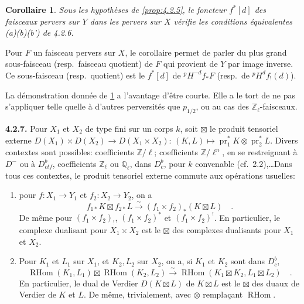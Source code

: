 \documentclass[12pt,a4paper]{article}
\theoremstyle{plain}
\newtheorem{corollary}[theorem]{Corollaire}
\theoremstyle{definition}
\DeclareMathOperator{\RHom}{RHom}
\newcommand{\isom}{\xrightarrow{\sim}}
\providecommand{\pr}{\operatorname{pr}}
\providecommand{\RHom}{\operatorname{RHom}}
\begin{document}
\begin{corollary}\label{cor:4.2.6.2}
Sous les hypoth\`{e}ses de \ref{prop:4.2.5}, le foncteur $f^{*}[d]$ des faisceaux pervers sur $Y$ dans les pervers sur $X$ v\'{e}rifie les conditions \'{e}quivalentes (a)(b)(b') de 4.2.6.
\end{corollary}

Pour $F$ un faisceau pervers sur $X$, le corollaire permet de parler du plus grand sous-faisceau (resp.\ faisceau quotient) de $F$ qui provient de $Y$ par image inverse. Ce sous-faisceau (resp.\ quotient) est le $f^{*}[d]$ de ${}^{p}H^{-d}f_{*}F$ (resp.\ de ${}^{p}H^{d}f_{!}(d)$).

La d\'{e}monstration donn\'{e}e de \ref{cor:4.2.6.2} a l'avantage d'\^{e}tre courte. Elle a le tort de ne pas s'appliquer telle quelle \`{a} d'autres perversit\'{e}s que $p_{1/2}$, ou au cas des $\mathbb{Z}_{\ell}$-faisceaux.

\noindent\textbf{4.2.7.} Pour $X_{1}$ et $X_{2}$ de type fini sur un corps $k$, soit $\boxtimes$ le produit tensoriel externe $D(X_{1}) \times D(X_{2}) \longrightarrow D(X_{1} \times X_{2})$: $(K,L) \longmapsto \pr_{1}^{*}K \otimes \pr_{2}^{*}L$. Divers contextes sont possibles: coefficients $\mathbb{Z}/\ell$; coefficients $\mathbb{Z}/\ell^{n}$, en se restreignant \`{a} $D^{-}$ ou \`{a} $D_{ctf}^{b}$, coefficients $\mathbb{Z}_{\ell}$ ou $\mathbb{Q}_{\ell}$, dans $D_{c}^{b}$, pour $k$ convenable (cf.\ 2.2),\ldots Dans tous ces contextes, le produit tensoriel externe commute aux op\'{e}rations usuelles:
\begin{enumerate}
\item[(a)] pour $f: X_{1} \to Y_{1}$ et $f_{2}: X_{2} \to Y_{2}$, on a
\[
f_{1*}K \boxtimes f_{2*}L \isom (f_{1} \times f_{2})_{*}(K \boxtimes L)\quad.
\]
De m\^{e}me pour $(f_{1} \times f_{2})_{!}$, $(f_{1} \times f_{2})^{*}$ et $(f_{1} \times f_{2})^{!}$. En particulier, le complexe dualisant pour $X_{1} \times X_{2}$ est le $\boxtimes$ des complexes dualisants pour $X_{1}$ et $X_{2}$.
\item[(b)] Pour $K_{1}$ et $L_{1}$ sur $X_{1}$, et $K_{2}, L_{2}$ sur $X_{2}$, on a, si $K_{1}$ et $K_{2}$ sont dans $D_{c}^{b}$,
\[
\RHom(K_{1},L_{1}) \boxtimes \RHom(K_{2},L_{2}) \isom \RHom(K_{1} \boxtimes K_{2}, L_{1} \boxtimes L_{2})\quad.
\]
En particulier, le dual de Verdier $D(K \boxtimes L)$ de $K \boxtimes L$ est le $\boxtimes$ des duaux de Verdier de $K$ et $L$. De m\^{e}me, trivialement, avec $\otimes$ rempla\c{c}ant $\RHom$.
\end{enumerate}
\end{document}
